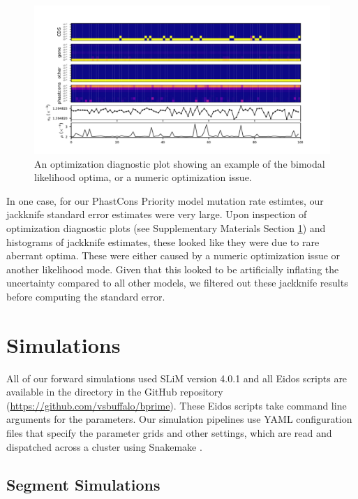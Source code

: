 \documentclass[11pt]{article}
\begin{document}
\begin{figure}[htbp]
  \label{suppfig:diag-plot-mode}
  \centering
  \includegraphics[width=\textwidth]{figures/supplementary/phastcons_diag_plot.pdf}

  \caption{An optimization diagnostic plot showing an example of the bimodal likelihood
  optima, or a numeric optimization issue.}
\end{figure}

In one case, for our PhastCons Priority model mutation rate estimtes, our
jackknife standard error estimates were very large. Upon inspection of
optimization diagnostic plots (see Supplementary Materials Section
\ref{suppfig:diag-plot-mode}) and histograms of jackknife estimates, these
looked like they were due to rare aberrant optima. These were either caused by
a numeric optimization issue or another likelihood mode. Given that this looked
to be artificially inflating the uncertainty compared to all other models, we
filtered out these jackknife results before computing the standard error.

\section{Simulations}
\label{supp:simulation}

All of our forward simulations used SLiM version 4.0.1
\parencite{Haller2019-vu,Haller2023-uk} and all Eidos scripts are available in
the  directory in the GitHub repository
(\url{https://github.com/vsbuffalo/bprime}). These Eidos scripts take command
line arguments for the parameters. Our simulation pipelines use YAML
configuration files that specify the parameter grids and other settings, which
are read and dispatched across a cluster using Snakemake
\parencite{Koster2012-iv}.

\subsection{Segment Simulations}
\end{document}
